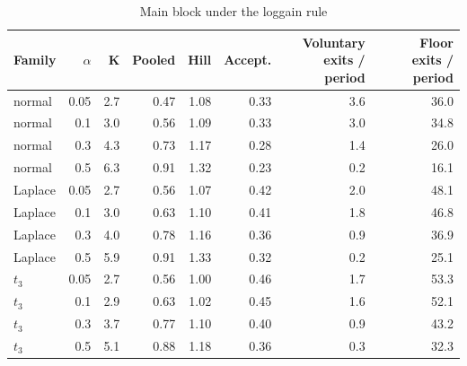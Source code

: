 \begin{table}[htbp]
\centering
\caption{Main block under the loggain rule}
\label{tab:a4_loggain_main}
\small
\begin{tabular}{lrrrrrrr}
\toprule
Family & $\alpha$ & K & Pooled & Hill & Accept. & \makecell[b]{Voluntary\\{}exits / period} & \makecell[b]{Floor\\{}exits / period} \\
\midrule
normal & 0.05 & 2.7 & 0.47 & 1.08 & 0.33 & 3.6 & 36.0 \\
normal & 0.1 & 3.0 & 0.56 & 1.09 & 0.33 & 3.0 & 34.8 \\
normal & 0.3 & 4.3 & 0.73 & 1.17 & 0.28 & 1.4 & 26.0 \\
normal & 0.5 & 6.3 & 0.91 & 1.32 & 0.23 & 0.2 & 16.1 \\
Laplace & 0.05 & 2.7 & 0.56 & 1.07 & 0.42 & 2.0 & 48.1 \\
Laplace & 0.1 & 3.0 & 0.63 & 1.10 & 0.41 & 1.8 & 46.8 \\
Laplace & 0.3 & 4.0 & 0.78 & 1.16 & 0.36 & 0.9 & 36.9 \\
Laplace & 0.5 & 5.9 & 0.91 & 1.33 & 0.32 & 0.2 & 25.1 \\
$t_3$ & 0.05 & 2.7 & 0.56 & 1.00 & 0.46 & 1.7 & 53.3 \\
$t_3$ & 0.1 & 2.9 & 0.63 & 1.02 & 0.45 & 1.6 & 52.1 \\
$t_3$ & 0.3 & 3.7 & 0.77 & 1.10 & 0.40 & 0.9 & 43.2 \\
$t_3$ & 0.5 & 5.1 & 0.88 & 1.18 & 0.36 & 0.3 & 32.3 \\
\bottomrule
\end{tabular}
\end{table}
